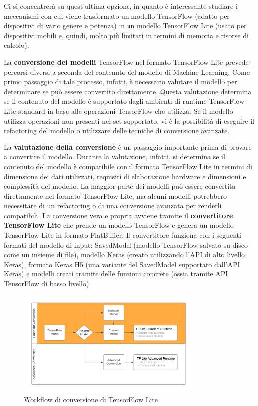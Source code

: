 Ci si concentrerà su quest’ultima opzione, in quanto è interessante studiare i meccanismi con cui viene trasformato un modello TensorFlow
(adatto per dispositivi di vario genere e potenza) in un modello TensorFlow Lite (usato per dispositivi mobili e, quindi, molto più limitati in termini
di memoria e risorse di calcolo).

La \textbf{conversione dei modelli} TensorFlow nel formato TensorFlow Lite prevede percorsi diversi a seconda del contenuto del modello di Machine Learning.
Come primo passaggio di tale processo, infatti, è necessario valutare il modello per determinare se può essere convertito direttamente.
Questa valutazione determina se il contenuto del modello è supportato dagli ambienti di runtime TensorFlow Lite standard in base alle operazioni
TensorFlow che utilizza. Se il modello utilizza operazioni non presenti nel set supportato, vi è la possibilità di eseguire il refactoring del modello
o utilizzare delle tecniche di conversione avanzate.

La \textbf{valutazione della conversione} è un passaggio importante prima di provare a convertire il modello. Durante la valutazione, infatti,
si determina se il contenuto del modello è compatibile con il formato TensorFlow Lite in termini di dimensione dei dati utilizzati, requisiti di
elaborazione hardware e dimensioni e complessità del modello. 
La maggior parte dei modelli può essere convertita direttamente nel formato TensorFlow Lite, ma alcuni modelli potrebbero necessitare di un refactoring o
di una conversione avanzata per renderli compatibili.
La conversione vera e propria avviene tramite il \textbf{convertitore TensorFlow Lite} che prende un modello TensorFlow e genera un modello TensorFlow Lite
in formato FlatBuffer. Il convertitore funziona con i seguenti formati del modello di input: SavedModel (modello TensorFlow salvato su disco come un
insieme di file), modello Keras (creato utilizzando l'API di alto livello Keras), formato Keras H5 (una variante del SavedModel supportato dall’API Keras)
e modelli creati tramite delle funzioni concrete (ossia tramite API TensorFlow di basso livello).

\begin{figure}[ht]
    \centering
    \includegraphics[width=0.8\textwidth]{Immagini/workflow.png}
    \caption{Workflow di conversione di TensorFlow Lite}
    \label{fig:workflow}
\end{figure}

